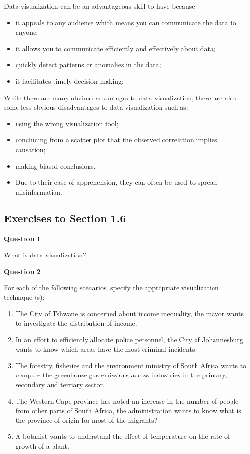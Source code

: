 \documentclass[
]{book}
\begin{document}
Data visualization can be an advantageous skill to have because

\begin{itemize}
\item
  it appeals to any audience which means you can communicate the data to anyone;
\item
  it allows you to communicate efficiently and effectively about data;
\item
  quickly detect patterns or anomalies in the data;
\item
  it facilitates timely decision-making;
\end{itemize}

While there are many obvious advantages to data visualization, there are also some less obvious disadvantages to data visualization such as:

\begin{itemize}
\item
  using the wrong visualization tool;
\item
  concluding from a scatter plot that the observed correlation implies causation;
\item
  making biased conclusions.
\item
  Due to their ease of apprehension, they can often be used to spread misinformation.
\end{itemize}

\subsection{Exercises to Section 1.6}\label{exercises-to-section-1.6}

\textbf{Question 1}

What is data visualization?

\textbf{Question 2}

For each of the following scenarios, specify the appropriate visualization technique (s):

\begin{enumerate}
\def\labelenumi{\alph{enumi}.}
\item
  The City of Tshwane is concerned about income inequality, the mayor wants to investigate the distribution of income.
\item
  In an effort to efficiently allocate police personnel, the City of Johannesburg wants to know which areas have the most criminal incidents.
\item
  The forestry, fisheries and the environment ministry of South Africa wants to compare the greenhouse gas emissions across industries in the primary, secondary and tertiary sector.
\item
  The Western Cape province has noted an increase in the number of people from other parts of South Africa, the administration wants to know what is the province of origin for most of the migrants?
\item
  A botanist wants to understand the effect of temperature on the rate of growth of a plant.
\end{enumerate}
\end{document}
